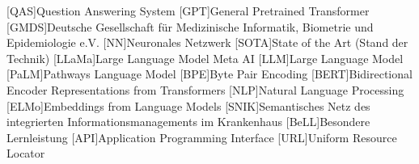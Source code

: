 \begin{acronym}[SPARQL]
    [QAS]{Question Answering System}
    [GPT]{General Pretrained Transformer}
    [GMDS]{Deutsche Gesellschaft für Medizinische Informatik, Biometrie und Epidemiologie e.V.}
    [NN]{Neuronales Netzwerk}
    [SOTA]{State of the Art (Stand der Technik)}
    [LLaMa]{Large Language Model Meta AI}
    [LLM]{Large Language Model}
    [PaLM]{Pathways Language Model}
    [BPE]{Byte Pair Encoding}
    [BERT]{Bidirectional Encoder Representations from Transformers}
    [NLP]{Natural Language Processing}
    [ELMo]{Embeddings from Language Models}
    [SNIK]{Semantisches Netz des integrierten Informationsmanagements im Krankenhaus}
    [BeLL]{Besondere Lernleistung}
    [API]{Application Programming Interface}
    [URL]{Uniform Resource Locator}
\end{acronym}
